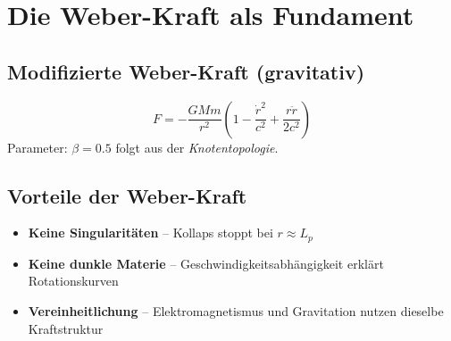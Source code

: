 \section{Die Weber-Kraft als Fundament}
\subsection{Modifizierte Weber-Kraft (gravitativ)}
\[
F = -\frac{GMm}{r^2}\left(1 - \frac{\dot{r}^2}{c^2} + \frac{r \ddot{r}}{2c^2}\right)
\]
Parameter: $\beta = 0.5$ folgt aus der \emph{Knotentopologie}.

\subsection{Vorteile der Weber-Kraft}
\begin{itemize}
\item \textbf{Keine Singularitäten} – Kollaps stoppt bei $r \approx L_p$
\item \textbf{Keine dunkle Materie} – Geschwindigkeitsabhängigkeit erklärt Rotationskurven
\item \textbf{Vereinheitlichung} – Elektromagnetismus und Gravitation nutzen dieselbe Kraftstruktur
\end{itemize}